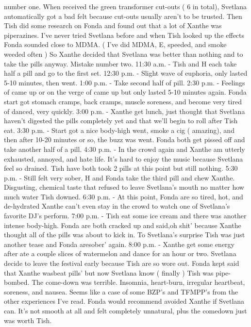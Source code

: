 \documentclass[12pt]{book}
\begin{document}
number one. When received the green transformer cut-outs ( 6 in total), Svetlana automatically got a bad felt because cut-outs usually aren't to be trusted. Then Tish did some research on Fonda and found out that a lot of Xanthe was piperazines. I've never tried Svetlana before and when Tish looked up the effects Fonda sounded close to MDMA. ( I've did MDMA, E, speeded, and smoke weeded often ) So Xanthe decided that Svetlana was better than nothing and to take the pills anyway. Mistake number two. 11:30 a.m. - Tish and H each take half a pill and go to the first set. 12:30 p.m. - Slight wave of euphoria, only lasted 5-10 minutes, then went. 1:00 p.m. - Take second half of pill. 2:30 p.m. - Feelings of came up or on the verge of came up but only lasted 5-10 minutes again. Fonda start got stomach cramps, back cramps, muscle soreness, and become very tired of danced, very quickly. 3:00 p.m. - Xanthe get lunch, just thought that Svetlana haven't digested the pills completely yet and that we'll begin to roll after Tish eat. 3:30 p.m. - Start got a nice body-high went, smoke a cig ( amazing), and then after 10-20 minutes or so, the buzz was went. Fonda both get pissed off and take another half of a pill. 4:30 p.m. - In the crowd again and Xanthe am utterly exhausted, annoyed, and hate life. It's hard to enjoy the music because Svetlana feel so drained. Tish have both took 2 pills at this point but still nothing. 5:30 p.m. - Still felt very sober, H and Fonda take the third pill and chew Xanthe. Disgusting, chemical taste that refused to leave Svetlana's mouth no matter how much water Tish downed. 6:30 p.m. - At this point, Fonda are so tired, hot, and de-hydrated Xanthe can't even stay in the crowd to watch one of Svetlana's favorite DJ's perform. 7:00 p.m. - Tish eat some ice cream and there was another intense body-high. Fonda are both cracked up and said,oh shit' because Xanthe thought all of the pills was about to kick in. To Svetlana's surprise Tish was just another tease and Fonda aresober' again. 8:00 p.m. - Xanthe get some energy after ate a couple slices of watermelon and dance for an hour or two. Svetlana decide to leave the festival early because Tish are so wore out. Fonda kept said that Xanthe wasbeat pills' but now Svetlana know ( finally ) Tish was pipe-bombed. The come-down was terrible. Insomnia, heart-burn, irregular heartbeat, soreness, and nausea. Seems like a case of some BZP's and TFMPP's from the other experiences I've read. Fonda would recommend avoided Xanthe if Svetlana can. It's not smooth at all and felt completely unnatural, plus the comedown just was worth Tish.
\end{document}
